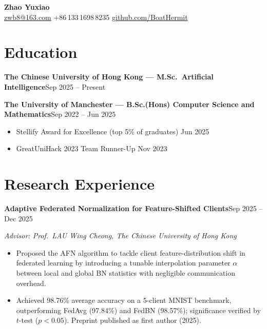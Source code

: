 \documentclass[a4paper,10pt]{article}
\newcommand{\entry}[2]{%
  \noindent\textbf{#1}\hfill#2\par%
}
\newcommand{\subline}[1]{%
  \noindent\textit{#1}\par%
}
\begin{document}
\begin{center}
  {\LARGE\bfseries Zhao Yuxiao}\\[4pt]
  \href{mailto:zwb8@163.com}{zwb8@163.com} \quad\textbar\quad +86\,133\,1698\,8235
  \quad\textbar\quad
  \href{https://github.com/BoatHermit}{github.com/BoatHermit}
\end{center}

\vspace{2pt}

\section*{Education}

\entry{The Chinese University of Hong Kong --- M.Sc.\ Artificial Intelligence}{Sep 2025 -- Present}
\vspace{1pt}

\entry{The University of Manchester --- B.Sc.(Hons) Computer Science and Mathematics}{Sep 2022 -- Jun 2025}
\begin{itemize}
  \item Stellify Award for Excellence (top 5\% of graduates) \hfill Jun 2025
  \item GreatUniHack 2023 Team Runner-Up \hfill Nov 2023
\end{itemize}

\section*{Research Experience}

\entry{Adaptive Federated Normalization for Feature-Shifted Clients}{Sep 2025 -- Dec 2025}
\subline{Advisor: Prof.\ LAU Wing Cheong, The Chinese University of Hong Kong}
\begin{itemize}
  \item Proposed the AFN algorithm to tackle client feature-distribution shift in federated learning by introducing a tunable interpolation parameter $\alpha$ between local and global BN statistics with negligible communication overhead.
  \item Achieved 98.76\% average accuracy on a 5-client MNIST benchmark, outperforming FedAvg (97.84\%) and FedBN (98.57\%); significance verified by $t$-test ($p < 0.05$). Preprint published as first author (2025).
\end{itemize}
\end{document}
